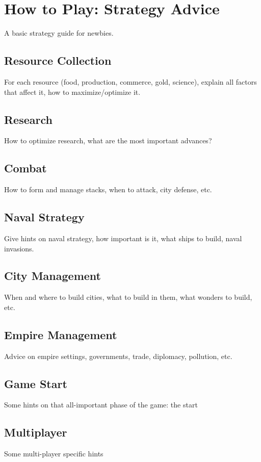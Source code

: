 \chapter{How to Play: Strategy Advice}
A basic strategy guide for newbies.

\section{Resource Collection}
For each resource (food, production, commerce, gold, science), explain all
factors that affect it, how to maximize/optimize it.

\section{Research}
How to optimize research, what are the most important advances?

\section{Combat}
How to form and manage stacks, when to attack, city defense, etc.

\section{Naval Strategy}
Give hints on naval strategy, how important is it, what ships to build, naval
invasions.

\section{City Management}
When and where to build cities, what to build in them, what wonders to build,
etc.

\section{Empire Management}
Advice on empire settings, governments, trade, diplomacy, pollution, etc.

\section{Game Start}
Some hints on that all-important phase of the game: the start

\section{Multiplayer}
Some multi-player specific hints

